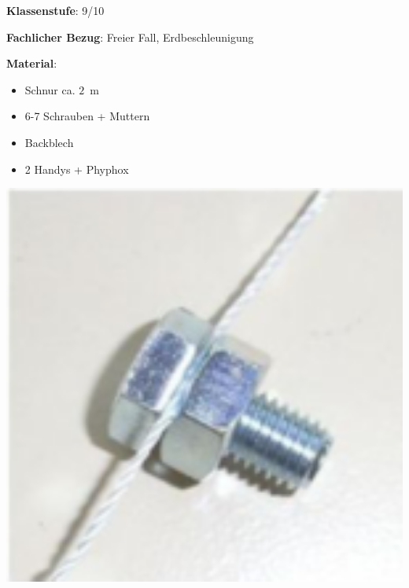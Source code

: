 \documentclass[../main.tex]{subfiles}
\begin{document}
\begin{tcolorbox}[
    width=\textwidth,
    height=\textheight,
    title=Phyphox: Fallschnur,
    fonttitle=\Large,
    before title=\vspace{0.2cm}, after title=\vspace{0.2cm},
    colback=white,
    title filled=true, 
    colbacktitle=myorange,
    colframe=black,
    coltitle=black,
    ]

    \begin{minipage}[]{0.75\textwidth}

        \begin{minipage}[]{0.75\textwidth}
            \textbf{Klassenstufe}: 9/10

            \vspace{0.5cm}

            \textbf{Fachlicher Bezug}: Freier Fall, Erdbeschleunigung

            \vspace{0.5cm}
            \textbf{Material}: 
            \begin{itemize}[noitemsep]
                \item Schnur ca. $2\,$ m
                \item 6-7 Schrauben + Muttern
                \item Backblech
                \item 2 Handys + Phyphox 
            \end{itemize}

        \end{minipage}
        \hspace{0.2cm}
        \begin{minipage}[]{0.20\textwidth}
            \includegraphics[width=1\textwidth]{img/schraube}


\end{minipage}
\end{minipage}
\end{tcolorbox}
\end{document}
